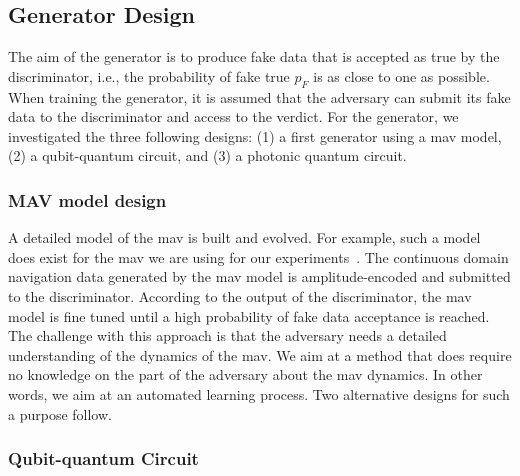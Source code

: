 \documentclass[letterpaper, 10pt, conference]{IEEEtran}
\begin{document}
\subsection{Generator Design}
\label{Generator}
The aim of the generator is to produce fake data that is accepted as
true by the discriminator, i.e., the probability of fake true $p_F$ is
as close to one as possible. When training the generator, it is
assumed that the adversary can submit its fake data to the
discriminator and access to the verdict. For the generator,
we investigated the three following designs: (1) a first generator using a
\gls*{mav} model, (2) a qubit-quantum circuit, and (3)
a photonic quantum circuit.

\subsubsection{MAV model design}

A detailed model of the \gls*{mav} is built and evolved. For example,
such a model does exist for the \gls*{mav} we are using for our
experiments~\cite{MathWorks2019}. The continuous domain navigation data
generated by the \gls*{mav} model is amplitude-encoded and submitted
to the discriminator. According to the output of the discriminator,
the \gls*{mav} model is fine tuned until a high probability of fake
data acceptance is reached. The challenge with this approach is that
the adversary needs a detailed understanding of the dynamics of the
\gls*{mav}. We aim at a method that does require no knowledge on the
part of the adversary about the \gls*{mav} dynamics. In other words,
we aim at an automated learning process. Two alternative designs for
such a purpose follow.

\subsubsection{Qubit-quantum Circuit}
\end{document}
